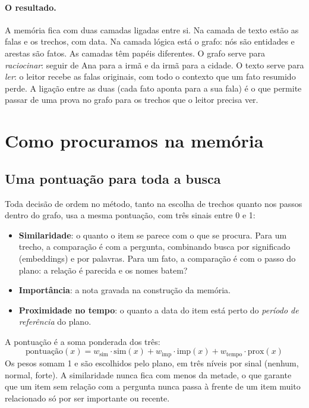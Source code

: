 \documentclass[11pt]{article}
\begin{document}
\paragraph{O resultado.} A memória fica com duas camadas ligadas entre si.
Na camada de texto estão as falas e os trechos, com data. Na camada lógica está
o grafo: nós são entidades e arestas são fatos. As camadas têm papéis
diferentes. O grafo serve para \emph{raciocinar}: seguir de Ana para a irmã e da
irmã para a cidade. O texto serve para \emph{ler}: o leitor recebe as falas
originais, com todo o contexto que um fato resumido perde. A ligação entre as
duas (cada fato aponta para a sua fala) é o que permite passar de uma prova no
grafo para os trechos que o leitor precisa ver.

\section{Como procuramos na memória}
\label{sec:busca}

\subsection{Uma pontuação para toda a busca}
\label{sec:pontuacao}

Toda decisão de ordem no método, tanto na escolha de trechos quanto nos passos
dentro do grafo, usa a mesma pontuação, com três sinais entre 0 e 1:
\begin{itemize}[leftmargin=*,itemsep=2pt]
\item \textbf{Similaridade}: o quanto o item se parece com o que se procura.
  Para um trecho, a comparação é com a pergunta, combinando busca por
  significado (embeddings) e por palavras. Para um fato, a comparação é com o
  passo do plano: a relação é parecida e os nomes batem?
\item \textbf{Importância}: a nota gravada na construção da memória.
\item \textbf{Proximidade no tempo}: o quanto a data do item está perto do
  \emph{período de referência} do plano.
\end{itemize}
A pontuação é a soma ponderada dos três:
\begin{equation}
\label{eq:pontuacao}
\boxed{\;\text{pontuação}(x)=w_{\text{sim}}\cdot\text{sim}(x)
+w_{\text{imp}}\cdot\text{imp}(x)+w_{\text{tempo}}\cdot\text{prox}(x)\;}
\end{equation}
Os pesos somam 1 e são escolhidos pelo plano, em três níveis por sinal
(nenhum, normal, forte). A similaridade nunca fica com menos da metade, o que
garante que um item sem relação com a pergunta nunca passa à frente de um item
muito relacionado só por ser importante ou recente.
\end{document}
